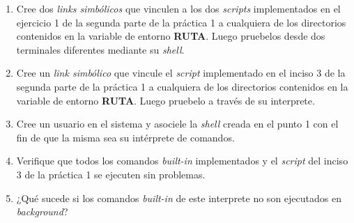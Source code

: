 \begin{enumerate}
	  \item Cree dos \textit{links simbólicos} que vinculen a los dos \textit{scripts} implementados en el ejercicio 1 de la segunda parte de la práctica 1 a cualquiera de los directorios contenidos en la variable de entorno \textbf{RUTA}. Luego pruebelos desde dos terminales diferentes mediante su \textit{shell}.

      \item Cree un \textit{link simbólico} que vincule el \textit{script} implementado en el inciso 3 de la segunda parte de la práctica 1 a cualquiera de los directorios contenidos en la variable de entorno \textbf{RUTA}. Luego pruebelo a través de su interprete.
      
      \item Cree un usuario en el sistema y asociele la \textit{shell} creada en el punto 1 con el fin de que la misma sea su intérprete de comandos.
      
      \item Verifique que todos los comandos \textit{built-in} implementados y el \textit{script} del inciso 3 de la práctica 1 se ejecuten sin problemas.

      \item ¿Qué sucede si los comandos \textit{built-in} de este interprete no son ejecutados en \textit{background}?

\end{enumerate}